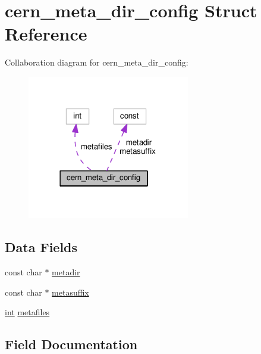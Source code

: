 \hypertarget{structcern__meta__dir__config}{}\section{cern\+\_\+meta\+\_\+dir\+\_\+config Struct Reference}
\label{structcern__meta__dir__config}


Collaboration diagram for cern\+\_\+meta\+\_\+dir\+\_\+config\+:
\nopagebreak
\begin{figure}[H]
\begin{center}
\leavevmode
\includegraphics[width=201pt]{structcern__meta__dir__config__coll__graph}
\end{center}
\end{figure}
\subsection*{Data Fields}
\begin{DoxyCompactItemize}
\item 
const char $\ast$ \hyperlink{structcern__meta__dir__config_a02effbe56095a73074becf6f3806e9b2}{metadir}
\item 
const char $\ast$ \hyperlink{structcern__meta__dir__config_aa81f342b78435b814b3484213deae315}{metasuffix}
\item 
\hyperlink{pcre_8txt_a42dfa4ff673c82d8efe7144098fbc198}{int} \hyperlink{structcern__meta__dir__config_a3ad2e7b71b4539b2d7d1f3ae20569400}{metafiles}
\end{DoxyCompactItemize}


\subsection{Field Documentation}
